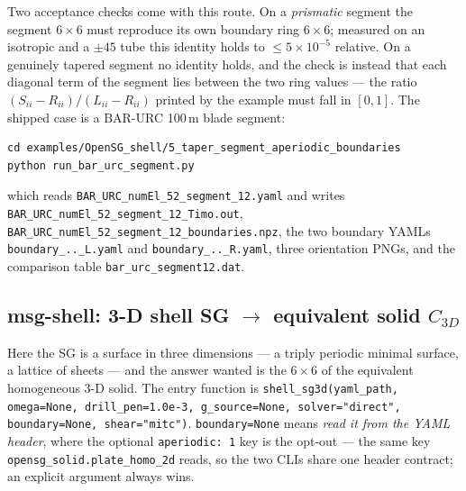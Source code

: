 Two acceptance checks come with this route. On a \emph{prismatic} segment the
segment $6\times6$ must reproduce its own boundary ring $6\times6$; measured on
an isotropic and a $\pm45$ tube this identity holds to
$\le 5\times10^{-5}$ relative. On a genuinely tapered segment no identity holds,
and the check is instead that each diagonal term of the segment lies between the
two ring values --- the ratio $(S_{ii}-R_{ii})/(L_{ii}-R_{ii})$ printed by the
example must fall in $[0,1]$. The shipped case is a BAR-URC 100\,m blade
segment:

\begin{lstlisting}[style=shellst]
cd examples/OpenSG_shell/5_taper_segment_aperiodic_boundaries
python run_bar_urc_segment.py
\end{lstlisting}

\noindent
which reads \texttt{BAR\_URC\_numEl\_52\_segment\_12.yaml} and writes
\texttt{BAR\_URC\_numEl\_52\_segment\_12\_Timo.out},
\texttt{BAR\_URC\_numEl\_52\_segment\_12\_boundaries.npz}, the two boundary
YAMLs \texttt{boundary\_..\_L.yaml} and \texttt{boundary\_..\_R.yaml}, three
orientation PNGs, and the comparison table \texttt{bar\_urc\_segment12.dat}.

\subsection{msg-shell: 3-D shell SG $\rightarrow$ equivalent solid $C_{3D}$}
\label{sec:pipe-shell3d}

Here the SG is a surface in three dimensions --- a triply periodic minimal
surface, a lattice of sheets --- and the answer wanted is the $6\times6$ of the
equivalent homogeneous 3-D solid. The entry function is
\texttt{shell\_sg3d(yaml\_path, omega=None, drill\_pen=1.0e-3,
g\_source=None, solver="direct", boundary=None, shear="mitc")}.
\texttt{boundary=None} means \emph{read it from the YAML header}, where the
optional \texttt{aperiodic: 1} key is the opt-out --- the same key
\texttt{opensg\_solid.plate\_homo\_2d} reads, so the two CLIs share one
header contract; an explicit argument always wins.

